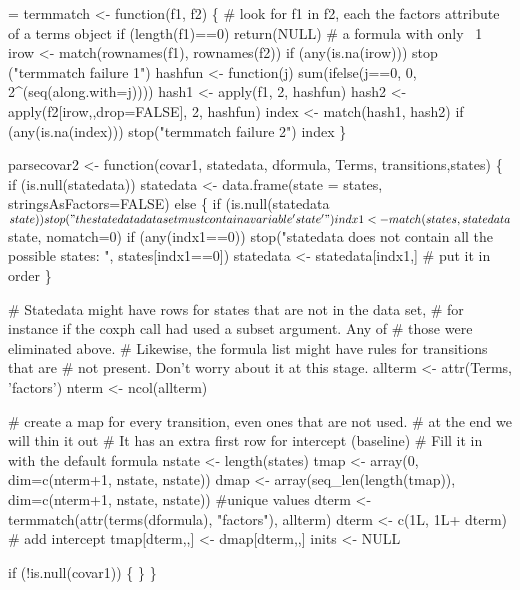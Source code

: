 \documentclass{article}
\begin{document}
\begin{nwchunk}
=
 termmatch <- function(f1, f2) \{
     # look for f1 in f2, each the factors attribute of a terms object
     if (length(f1)==0) return(NULL)   # a formula with only ~1
     irow <- match(rownames(f1), rownames(f2))
     if (any(is.na(irow))) stop ("termmatch failure 1") 
     hashfun <- function(j) sum(ifelse(j==0, 0, 2^(seq(along.with=j))))
     hash1 <- apply(f1, 2, hashfun)
     hash2 <- apply(f2[irow,,drop=FALSE], 2, hashfun)
     index <- match(hash1, hash2)
     if (any(is.na(index))) stop("termmatch failure 2")
     index
 \}
 
 parsecovar2 <- function(covar1, statedata, dformula, Terms, transitions,states) \{
     if (is.null(statedata))
         statedata <- data.frame(state = states, stringsAsFactors=FALSE)
     else \{
         if (is.null(statedata$state)) 
             stop("the statedata data set must contain a variable 'state'")
         indx1 <- match(states, statedata$state, nomatch=0)
         if (any(indx1==0))
             stop("statedata does not contain all the possible states: ", 
                  states[indx1==0])
         statedata <- statedata[indx1,]   # put it in order
     \}
     
     # Statedata might have rows for states that are not in the data set,
     #  for instance if the coxph call had used a subset argument.  Any of
     #  those were eliminated above.
     # Likewise, the formula list might have rules for transitions that are
     #  not present.  Don't worry about it at this stage.
     allterm <- attr(Terms, 'factors')
     nterm <- ncol(allterm)
 
     # create a map for every transition, even ones that are not used.
     # at the end we will thin it out
     # It has an extra first row for intercept (baseline)
     # Fill it in with the default formula
     nstate <- length(states)
     tmap <- array(0, dim=c(nterm+1, nstate, nstate))
     dmap <- array(seq_len(length(tmap)), dim=c(nterm+1, nstate, nstate)) #unique values
     dterm <- termmatch(attr(terms(dformula), "factors"), allterm)
     dterm <- c(1L, 1L+ dterm)  # add intercept
     tmap[dterm,,] <- dmap[dterm,,]
     inits <- NULL
 
     if (!is.null(covar1)) \{
     \}
 \}
\end{nwchunk}
\end{document}
